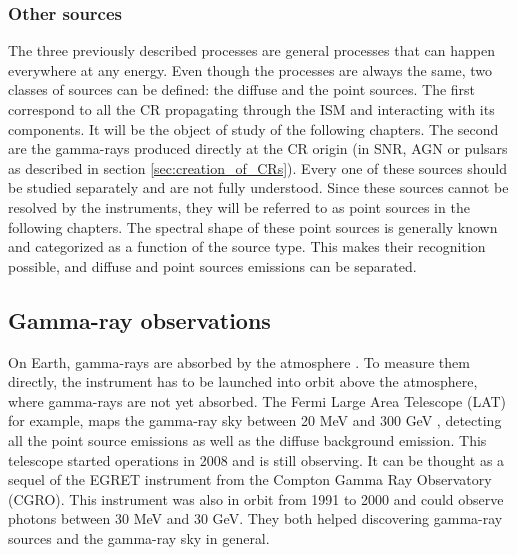 \subsubsection{Other sources}

The three previously described processes are general processes that can happen everywhere at any energy. Even though the processes are always the same, two classes of sources can be defined: the diffuse and the point sources.
The first correspond to all the CR propagating through the ISM and interacting with its components. It will be the object of study of the following chapters. 
The second are the gamma-rays produced directly at the CR origin (in SNR, AGN or pulsars as described in section \ref{sec:creation_of_CRs}). Every one of these sources should be studied separately and are not fully understood. Since these sources cannot be resolved by the instruments, they will be referred to as point sources in the following chapters. The spectral shape of these point sources is generally known and categorized as a function of the source type. This makes their recognition possible, and diffuse and point sources emissions can be separated.




\subsection{Gamma-ray observations}

On Earth, gamma-rays are absorbed by the atmosphere \cite{HSU}. To measure them directly, the instrument has to be launched into orbit above the atmosphere, where gamma-rays are not yet absorbed. The Fermi Large Area Telescope (LAT) for example, maps the gamma-ray sky between 20 MeV and 300 GeV \cite{Fermi2009}, detecting all the point source emissions as well as the diffuse background emission. This telescope started operations in 2008 and is still observing. It can be thought as a sequel of the EGRET instrument \cite{Bertsch1989} from the Compton Gamma Ray Observatory (CGRO). This instrument was also in orbit from 1991 to 2000 and could observe photons between 30 MeV and 30 GeV. They both helped discovering gamma-ray sources and the gamma-ray sky in general.


